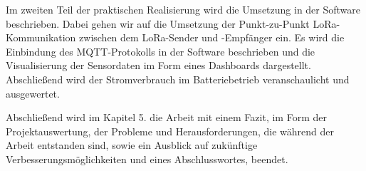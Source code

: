 Im zweiten Teil der praktischen Realisierung wird die Umsetzung in der Software beschrieben. Dabei gehen wir auf die Umsetzung der Punkt-zu-Punkt LoRa-Kommunikation zwischen dem LoRa-Sender und -Empfänger ein. Es wird die Einbindung des MQTT-Protokolls in der Software beschrieben und die Visualisierung der Sensordaten im Form eines Dashboards dargestellt. Abschließend wird der Stromverbrauch im Batteriebetrieb veranschaulicht und ausgewertet. 

Abschließend wird im Kapitel 5. die Arbeit mit einem Fazit, im Form der Projektauswertung, der Probleme und Herausforderungen, die während der Arbeit entstanden sind, sowie ein Ausblick auf zukünftige Verbesserungsmöglichkeiten und eines Abschlusswortes, beendet. 
